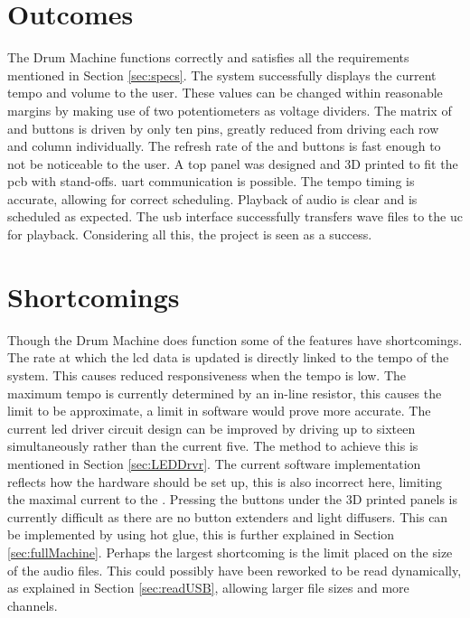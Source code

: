 \documentclass[12pt,a4paper]{report}
\begin{document}
\section{Outcomes}
The Drum Machine functions correctly and satisfies all the requirements mentioned in Section \ref{sec:specs}. The system successfully displays the current tempo and volume to the user. These values can be changed within reasonable margins by making use of two potentiometers as voltage dividers. The matrix of  and buttons is driven by only ten pins, greatly reduced from driving each row and column individually. The refresh rate of the  and buttons is fast enough to not be noticeable to the user. A top panel was designed and 3D printed to fit the \ac{pcb} with stand-offs. \ac{uart} communication is possible. The tempo timing is accurate, allowing for correct scheduling. Playback of audio is clear and is scheduled as expected. The \ac{usb} interface successfully transfers wave files to the \ac{uc} for playback. Considering all this, the project is seen as a success.
\section{Shortcomings}
Though the Drum Machine does function some of the features have shortcomings. The rate at which the \ac{lcd} data is updated is directly linked to the tempo of the system. This causes reduced responsiveness when the tempo is low. The maximum tempo is currently determined by an in-line resistor, this causes the limit to be approximate, a limit in software would prove more accurate. The current \ac{led} driver circuit design can be improved by driving up to sixteen  simultaneously rather than the current five. The method to achieve this is mentioned in Section \ref{sec:LEDDrvr}. The current software implementation reflects how the hardware should be set up, this is also incorrect here, limiting the maximal current to the . Pressing the buttons under the 3D printed panels is currently difficult as there are no button extenders and light diffusers. This can be implemented by using hot glue, this is further explained in Section \ref{sec:fullMachine}. Perhaps the largest shortcoming is the limit placed on the size of the audio files. This could possibly have been reworked to be read dynamically, as explained in Section \ref{sec:readUSB}, allowing larger file sizes and more channels.
\newpage
\end{document}
